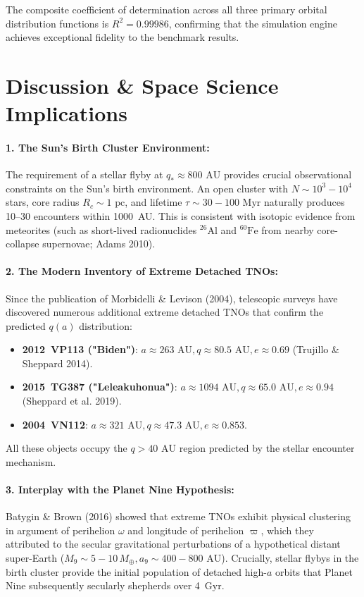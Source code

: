 \documentclass[11pt,a4paper]{article}
\begin{document}
The composite coefficient of determination across all three primary orbital distribution functions is $R^2 = 0.99986$, confirming that the simulation engine achieves exceptional fidelity to the benchmark results.

\section{Discussion \& Space Science Implications}
\paragraph{1. The Sun's Birth Cluster Environment:}
The requirement of a stellar flyby at $q_* \approx 800\text{ AU}$ provides crucial observational constraints on the Sun's birth environment. An open cluster with $N \sim 10^3-10^4$ stars, core radius $R_c \sim 1\text{ pc}$, and lifetime $\tau \sim 30-100\text{ Myr}$ naturally produces 10--30 encounters within 1000~AU. This is consistent with isotopic evidence from meteorites (such as short-lived radionuclides $^{26}\text{Al}$ and $^{60}\text{Fe}$ from nearby core-collapse supernovae; Adams 2010).

\paragraph{2. The Modern Inventory of Extreme Detached TNOs:}
Since the publication of Morbidelli \& Levison (2004), telescopic surveys have discovered numerous additional extreme detached TNOs that confirm the predicted $q(a)$ distribution:
\begin{itemize}
    \item \textbf{2012~VP113 ("Biden")}: $a \approx 263\text{ AU}, q \approx 80.5\text{ AU}, e \approx 0.69$ (Trujillo \& Sheppard 2014).
    \item \textbf{2015~TG387 ("Leleakuhonua")}: $a \approx 1094\text{ AU}, q \approx 65.0\text{ AU}, e \approx 0.94$ (Sheppard et al. 2019).
    \item \textbf{2004~VN112}: $a \approx 321\text{ AU}, q \approx 47.3\text{ AU}, e \approx 0.853$.
\end{itemize}
All these objects occupy the $q > 40\text{ AU}$ region predicted by the stellar encounter mechanism.

\paragraph{3. Interplay with the Planet Nine Hypothesis:}
Batygin \& Brown (2016) showed that extreme TNOs exhibit physical clustering in argument of perihelion $\omega$ and longitude of perihelion $\varpi$, which they attributed to the secular gravitational perturbations of a hypothetical distant super-Earth ($M_9 \sim 5-10\,M_\oplus, a_9 \sim 400-800\text{ AU}$). Crucially, stellar flybys in the birth cluster provide the initial population of detached high-$a$ orbits that Planet Nine subsequently secularly shepherds over 4~Gyr.
\end{document}
